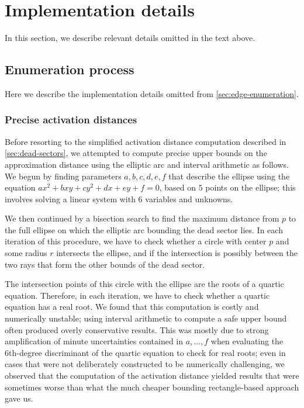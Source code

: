 \section{Implementation details}
\label{sec:implementation-details}
In this section, we describe relevant details omitted in the text above.

\subsection{Enumeration process}
\label{sec:dead-sector-construction-neighbors}
Here we describe the implementation details omitted from \cref{sec:edge-enumeration}.

\subsubsection{Precise activation distances}
\label{sec:precise-activation-distances}
Before resorting to the simplified activation distance computation described in \cref{sec:dead-sectors},
we attempted to compute precise upper bounds on the approximation distance using the elliptic arc and interval arithmetic as follows.
We begun by finding parameters $a,b,c,d,e,f$ that describe the ellipse using the equation $ax^2 + bxy + cy^2 + dx + ey + f = 0$,
based on $5$ points on the ellipse; this involves solving a linear system with $6$ variables and unknowns.

We then continued by a bisection search to find the maximum distance from $p$ to the full ellipse
on which the elliptic arc bounding the dead sector lies.
In each iteration of this procedure, we have to check whether a circle with center $p$ and some radius $r$ 
intersects the ellipse, and if the intersection is possibly between the two rays that form the other bounds of the dead sector.

The intersection points of this circle with the ellipse are the roots of a quartic equation.
Therefore, in each iteration, we have to check whether a quartic equation has a real root.
We found that this computation is costly and numerically unstable;
using interval arithmetic to compute a safe upper bound often produced overly conservative results.
This was mostly due to strong amplification of minute uncertainties contained in $a,\ldots,f$ when evaluating
the 6th-degree discriminant of the quartic equation to check for real roots;
even in cases that were not deliberately constructed to be numerically challenging,
we observed that the computation of the activation distance yielded results that were sometimes worse
than what the much cheaper bounding rectangle-based approach gave us.

